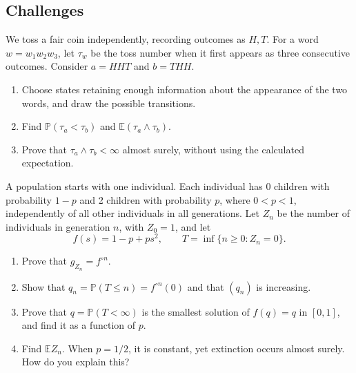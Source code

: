 \documentclass[11pt,a4paper]{article}
\newenvironment{enumeratea}{\begin{enumerate}[label=(\alph*),itemsep=0.28em,topsep=0.25em]}{\end{enumerate}}
\newcommand{\Pbb}{\mathbb P}
\newcommand{\Ebb}{\mathbb E}
\newcounter{problem}[section]
\begin{document}
\subsection*{Challenges}
\begin{problemstar}\label{prob:week4-penney}
We toss a fair coin independently, recording outcomes as $H,T$. For a word
$w=w_1w_2w_3$, let $\tau_w$ be the toss number when it first appears as three
consecutive outcomes. Consider $a=HHT$ and $b=THH$.
\begin{enumeratea}
  \item Choose states retaining enough information about the appearance of the
  two words, and draw the possible transitions.
  \item Find $\Pbb(\tau_a<\tau_b)$ and $\Ebb(\tau_a\wedge\tau_b)$.
  \item Prove that $\tau_a\wedge\tau_b<\infty$ almost surely, without using the calculated expectation.
\end{enumeratea}
\end{problemstar}
\begin{problemstar}
A population starts with one individual. Each individual has 0 children with
probability $1-p$ and 2 children with probability $p$, where $0<p<1$, independently
of all other individuals in all generations. Let $Z_n$ be the number of individuals
in generation $n$, with $Z_0=1$, and let
\[ f(s)=1-p+ps^2,\qquad T=\inf\{n\ge0:Z_n=0\}. \]
\begin{enumeratea}
  \item Prove that $g_{Z_n}=f^{\circ n}$.
  \item Show that $q_n=\Pbb(T\le n)=f^{\circ n}(0)$ and that $(q_n)$ is increasing.
  \item Prove that $q=\Pbb(T<\infty)$ is the smallest solution of $f(q)=q$ in
  $[0,1]$, and find it as a function of $p$.
  \item Find $\Ebb Z_n$. When $p=1/2$, it is constant, yet extinction occurs almost surely.
  How do you explain this?
\end{enumeratea}
\end{problemstar}
\end{document}
